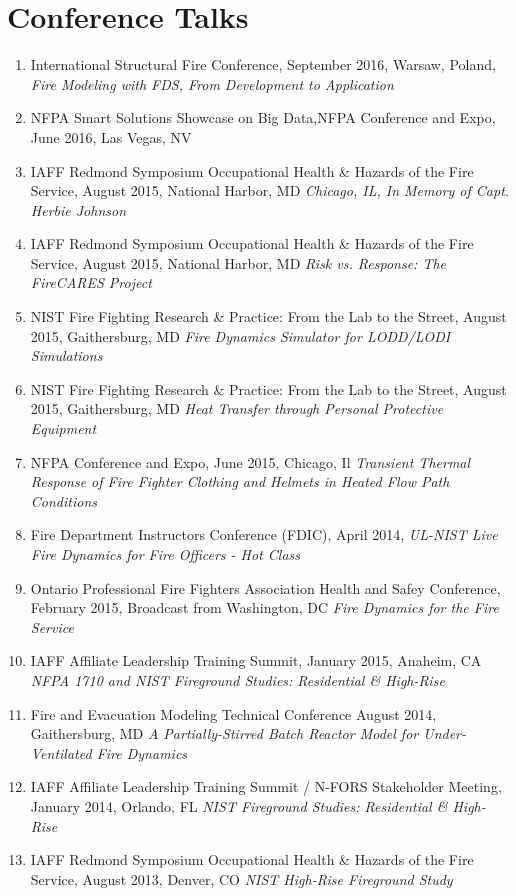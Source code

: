 \documentclass[10pt,letterpaper]{article}
\begin{document}
\section*{Conference Talks}
\begin{enumerate}
\item International Structural Fire Conference, September 2016, Warsaw, Poland, {\em Fire Modeling with FDS, From Development to Application}
\item NFPA Smart Solutions Showcase on Big Data,NFPA Conference and Expo, June 2016, Las Vegas, NV
\item IAFF Redmond Symposium Occupational Health \& Hazards of the Fire Service, August 2015, National Harbor, MD {\em Chicago, IL, In Memory of Capt. Herbie Johnson}
\item IAFF Redmond Symposium Occupational Health \& Hazards of the Fire Service, August 2015, National Harbor, MD {\em Risk vs. Response: The FireCARES Project}
\item NIST Fire Fighting Research \& Practice: From the Lab to the Street, August 2015, Gaithersburg, MD {\em Fire Dynamics Simulator for LODD/LODI Simulations}
\item NIST Fire Fighting Research \& Practice: From the Lab to the Street, August 2015, Gaithersburg, MD {\em Heat Transfer through Personal Protective Equipment}
\item NFPA Conference and Expo, June 2015, Chicago, Il {\em Transient Thermal Response of Fire Fighter Clothing and Helmets in Heated Flow Path Conditions}
\item Fire Department Instructors Conference (FDIC), April 2014, {\em UL-NIST Live Fire Dynamics for Fire Officers - Hot Class}
\item Ontario Professional Fire Fighters Association Health and Safey Conference, February 2015, Broadcast from Washington, DC {\em Fire Dynamics for the Fire Service}
\item IAFF Affiliate Leadership Training Summit, January 2015, Anaheim, CA {\em NFPA 1710 and NIST Fireground Studies: Residential \& High-Rise}
\item Fire and Evacuation Modeling Technical Conference August 2014, Gaithersburg, MD {\em A Partially-Stirred Batch Reactor Model for Under-Ventilated Fire Dynamics}
\item IAFF Affiliate Leadership Training Summit / N-FORS Stakeholder Meeting, January 2014, Orlando, FL {\em NIST Fireground Studies: Residential \& High-Rise}
\item IAFF Redmond Symposium Occupational Health \& Hazards of the Fire Service, August 2013, Denver, CO {\em NIST High-Rise Fireground Study}

\end{enumerate}
\end{document}
